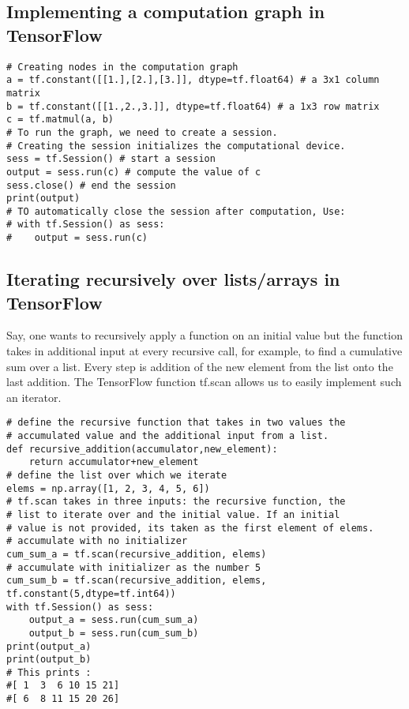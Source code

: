 \documentclass[10pt,letterpaper]{article}
\begin{document}
\subsection*{Implementing a computation graph in TensorFlow}

\begin{verbatim}
# Creating nodes in the computation graph 
a = tf.constant([[1.],[2.],[3.]], dtype=tf.float64) # a 3x1 column matrix 
b = tf.constant([[1.,2.,3.]], dtype=tf.float64) # a 1x3 row matrix 
c = tf.matmul(a, b) 
# To run the graph, we need to create a session.
# Creating the session initializes the computational device.
sess = tf.Session() # start a session
output = sess.run(c) # compute the value of c
sess.close() # end the session
print(output)
# TO automatically close the session after computation, Use:
# with tf.Session() as sess:
#    output = sess.run(c) 
\end{verbatim}

\subsection*{Iterating recursively over lists/arrays in TensorFlow}

Say, one wants to recursively apply a function on an initial value but the function takes in additional input at every recursive call, for example, to find a cumulative sum over a list. Every step is addition of the new element from the list onto the last addition. The TensorFlow function tf.scan allows us to easily implement such an iterator.

\begin{verbatim}
# define the recursive function that takes in two values the
# accumulated value and the additional input from a list.
def recursive_addition(accumulator,new_element):
    return accumulator+new_element
# define the list over which we iterate
elems = np.array([1, 2, 3, 4, 5, 6])
# tf.scan takes in three inputs: the recursive function, the 
# list to iterate over and the initial value. If an initial 
# value is not provided, its taken as the first element of elems.
# accumulate with no initializer
cum_sum_a = tf.scan(recursive_addition, elems) 
# accumulate with initializer as the number 5
cum_sum_b = tf.scan(recursive_addition, elems, tf.constant(5,dtype=tf.int64))
with tf.Session() as sess:
    output_a = sess.run(cum_sum_a)
    output_b = sess.run(cum_sum_b)
print(output_a)
print(output_b)
# This prints :
#[ 1  3  6 10 15 21]
#[ 6  8 11 15 20 26]
\end{verbatim}
\end{document}
